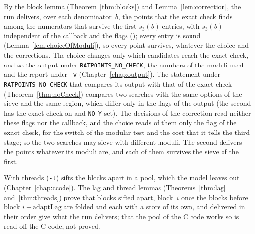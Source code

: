 By the block lemma (Theorem~\ref{thm:blocks}) and Lemma~\ref{lem:correction}, the run delivers, over
each denominator~$b$, the points that the exact check finds among the numerators that survive the
first $s_3(b)$ entries, with $s_3(b)$ independent of the callback and the flags
(); every entry is sound
(Lemma~\ref{lem:choiceOfModuli}), so every point survives, whatever the choice and the corrections.
The choice changes only which candidates reach the exact check, and so the output under
\verb|RATPOINTS_NO_CHECK|, the numbers of the moduli used and the report under \verb|-v|
(Chapter~\ref{chap:output}). The statement under \verb|RATPOINTS_NO_CHECK| that compares its output
with that of the exact check (Theorem~\ref{thm:noCheck}) compares two searches with the same options
of the sieve and the same region, which differ only in the flags of the output (the second has the
exact check on and \verb|NO_Y| set). The decisions of the correction read neither these flags nor
the callback, and the choice reads of them only the flag of the exact check, for the switch of the
modular test and the cost that it tells the third stage; so the two searches may sieve with
different moduli. The second delivers the points whatever its moduli are, and each of them survives
the sieve of the first.

With threads (\verb|-t|) \ratpoints{} sifts the blocks apart in a pool, which the model leaves out
(Chapter~\ref{chap:ccode}). The lag and thread lemmas (Theorems~\ref{thm:lag}
and~\ref{thm:threads}) prove that blocks sifted apart, block~$i$ once the blocks before block
$i - \mathrm{adaptLag}$ are folded and each with a store of its own, and delivered in their order
give what the run delivers; that the pool of the C code works so is read off the C code, not
proved.
